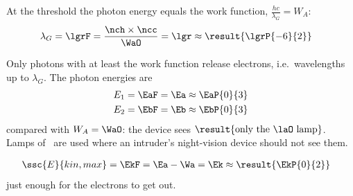 \begin{abcliste}
\abc At the threshold the photon energy equals the work function, $\frac{hc}{\lambda_G} = W_A$:
\begin{align}
 \lambda_G &= \lgrF = \frac{\nch\times\ncc}{\WaO} = \lgr \approx \result{\lgrP{-6}{2}}
\end{align}

\abc Only photons with at least the work function release electrons, i.e.\ wavelengths up to $\lambda_G$. The photon energies are
\begin{align}
 E_1 &= \EaF = \Ea \approx \EaP{0}{3} \\
 E_2 &= \EbF = \Eb \approx \EbP{0}{3}
\end{align}
compared with $W_A = \WaO$: the device sees $\result{\text{only the \laO\ lamp}}$. Lamps of \lbO\ are used where an intruder's night-vision device should not see them.

\abc
\begin{align}
 \ssc{E}{kin,max} &= \EkF = \Ea - \Wa = \Ek \approx \result{\EkP{0}{2}}
\end{align}
just enough for the electrons to get out.
\end{abcliste}
